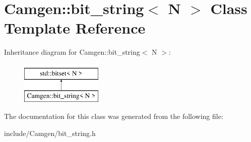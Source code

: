 \hypertarget{a00029}{\section{Camgen\-:\-:bit\-\_\-string$<$ N $>$ Class Template Reference}
\label{a00029}
}
Inheritance diagram for Camgen\-:\-:bit\-\_\-string$<$ N $>$\-:\begin{figure}[H]
\begin{center}
\leavevmode
\includegraphics[height=2.000000cm]{a00029}
\end{center}
\end{figure}


The documentation for this class was generated from the following file\-:\begin{DoxyCompactItemize}
\item 
include/\-Camgen/bit\-\_\-string.\-h\end{DoxyCompactItemize}
